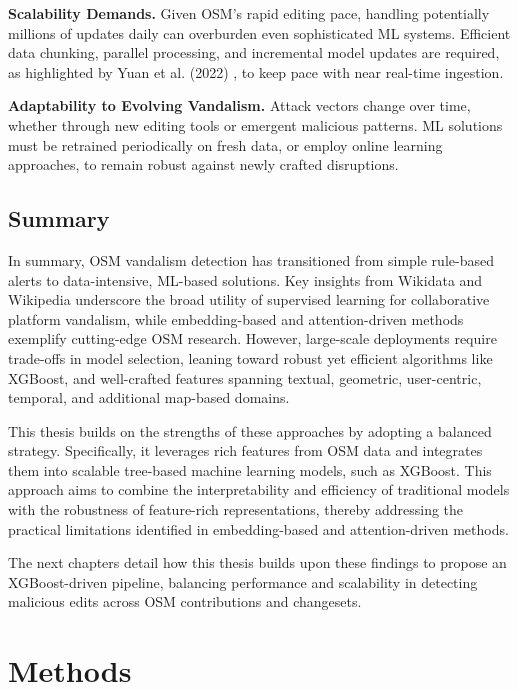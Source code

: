 \documentclass[
    13pt, %
    a4paper, %
    DIV14, %
    listof=totoc, %
    bibliography=totoc, %
    index=totoc, %
    headsepline
]{scrreprt}
\begin{document}
\noindent
\textbf{Scalability Demands.}
Given OSM’s rapid editing pace, handling potentially millions of updates daily can overburden even sophisticated ML systems. Efficient data chunking, parallel processing, and incremental model updates are required, as highlighted by Yuan et al. (2022) \cite{Yuan2022}, to keep pace with near real-time ingestion.

\noindent
\textbf{Adaptability to Evolving Vandalism.}
Attack vectors change over time, whether through new editing tools or emergent malicious patterns. ML solutions must be retrained periodically on fresh data, or employ online learning approaches, to remain robust against newly crafted disruptions.


\section{Summary}

In summary, OSM vandalism detection has transitioned from simple rule-based alerts to data-intensive, ML-based solutions. Key insights from Wikidata and Wikipedia underscore the broad utility of supervised learning for collaborative platform vandalism, while embedding-based and attention-driven methods exemplify cutting-edge OSM research. However, large-scale deployments require trade-offs in model selection, leaning toward robust yet efficient algorithms like XGBoost, and well-crafted features spanning textual, geometric, user-centric, temporal, and additional map-based domains.

This thesis builds on the strengths of these approaches by adopting a balanced strategy. Specifically, it leverages rich features from OSM data and integrates them into scalable tree-based machine learning models, such as XGBoost. This approach aims to combine the interpretability and efficiency of traditional models with the robustness of feature-rich representations, thereby addressing the practical limitations identified in embedding-based and attention-driven methods.

The next chapters detail how this thesis builds upon these findings to propose an XGBoost-driven pipeline, balancing performance and scalability in detecting malicious edits across OSM contributions and changesets.


\chapter{Methods}
\label{chap:methods}
\end{document}
